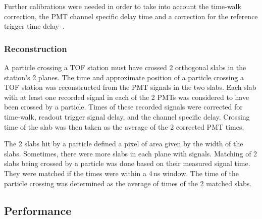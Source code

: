 Further calibrations were needed in order to take into account the
time-walk correction, the PMT channel specific delay time and
a correction for the reference trigger time delay~\cite{NOTE251}.

\subsubsection{Reconstruction}

A particle crossing a TOF station must have crossed 2 orthogonal slabs
in the station's 2 planes.  The time and approximate position of
a particle crossing a TOF station was reconstructed from the PMT signals
in the two slabs. Each slab with at least one recorded signal in each
of the 2 PMTs was considered to have been crossed by a
particle. Times of these recorded signals were corrected for
time-walk, readout trigger signal delay, and the channel specific
delay. Crossing time of the slab was then taken as the average of
the 2 corrected PMT times.

The 2 slabs hit by a particle defined a pixel of area given by the
width of the slabs. Sometimes, there were more slabs in each plane
with signals. Matching of 2 slabs being crossed by a particle was done
based on their measured signal time. They were matched if the times
were within a 4\,ns window. The time of the particle crossing was
determined as the average of times of the 2 matched slabs.


\subsection{Performance}
\label{SubSect:TOF_Performance}


